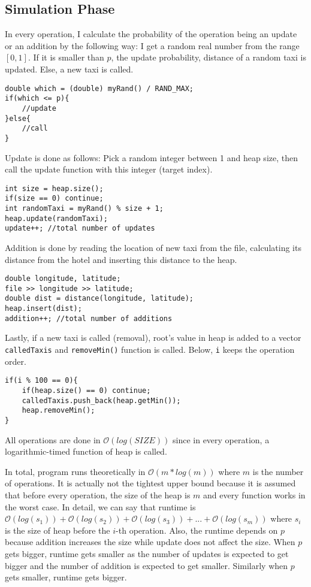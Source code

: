 \documentclass[12pt, a4paper]{article}
\begin{document}
\subsection{Simulation Phase}
In every operation, I calculate the probability of the operation being an update or an addition by the following way: I get a random real number from the range $[0, 1]$. If it is smaller than $p$, the update probability, distance of a random taxi is updated. Else, a new taxi is called.
\begin{lstlisting}
double which = (double) myRand() / RAND_MAX;
if(which <= p){
    //update
}else{
    //call
}
\end{lstlisting}
\newpage
\noindent Update is done as follows: Pick a random integer between 1 and heap size, then call the update function with this integer (target index).
\begin{lstlisting}
int size = heap.size();
if(size == 0) continue;
int randomTaxi = myRand() % size + 1;
heap.update(randomTaxi);
update++; //total number of updates
\end{lstlisting}
Addition is done by reading the location of new taxi from the file, calculating its distance from the hotel and inserting this distance to the heap.
\begin{lstlisting}
double longitude, latitude;
file >> longitude >> latitude;
double dist = distance(longitude, latitude);
heap.insert(dist);
addition++; //total number of additions
\end{lstlisting}
Lastly, if a new taxi is called (removal), root's value in heap is added to a vector \texttt{calledTaxis} and \texttt{removeMin()} function is called. Below, \texttt{i} keeps the operation order.
\begin{lstlisting}
if(i % 100 == 0){
    if(heap.size() == 0) continue;
    calledTaxis.push_back(heap.getMin());
    heap.removeMin();
}
\end{lstlisting}
All operations are done in $\mathcal{O}(log(SIZE))$ since in every operation, a logarithmic-timed function of heap is called.

In total, program runs theoretically in $\mathcal{O}(m*log(m))$ where $m$ is the number of operations. It is actually not the tightest upper bound because it is assumed that before every operation, the size of the heap is $m$ and every function works in the worst case. In detail, we can say that runtime is $\mathcal{O}(log(s_1)) + \mathcal{O}(log(s_2)) + \mathcal{O}(log(s_3)) + ... + \mathcal{O}(log(s_m))$ where $s_i$ is the size of heap before the $i$-th operation. Also, the runtime depends on $p$ because addition increases the size while update does not affect the size. When $p$ gets bigger, runtime gets smaller as the number of updates is expected to get bigger and the number of addition is expected to get smaller. Similarly when $p$ gets smaller, runtime gets bigger.
\newpage
\end{document}

